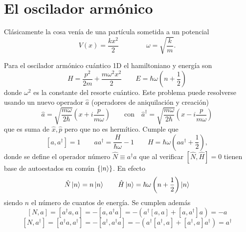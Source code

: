 \documentclass[10pt,oneside]{CBFT_book}
\begin{document}
% 
\chapter{El oscilador armónico}

Clásicamente la cosa venía de una partícula sometida a un potencial
\[
	V(x) = \frac{kx^2}{2} \qquad \qquad \omega = \sqrt{\frac{k}{m}}.
\]

Para el oscilador armónico cuántico 1D el hamiltoniano y energía son
\[
	H = \frac{p^2}{2m} + \frac{m\omega^2 x^2}{2} \qquad E = \hbar \omega \left( n + \frac{1}{2} \right)
\]
donde $\omega^2$ es la constante del resorte cuántico.
Este problema puede resolverse usando un nuevo operador $\hat{a}$ (operadores de aniquilación
y creación)
\[
	\hat{a} = \sqrt{\frac{m\omega}{2\hbar}}\left( x + i\frac{p}{m\omega} \right) \qquad \text{con} \quad 
	\hat{a}^\dagger = \sqrt{\frac{m\omega}{2\hbar}}\left( x - i\frac{p}{m\omega} \right)
\]
que es suma de $\hat{x}, \hat{p}$ pero que no es hermítico. Cumple que 
\[
	[a , a^\dagger ] = 1 \qquad a a^\dagger =  \frac{H}{\hbar\omega} -1 \qquad 
	H = \hbar\omega \left( a a^\dagger + \frac{1}{2} \right),
\]
donde se define el operador número $\hat{N}\equiv a^\dagger a$ que al verificar $[\hat{N},\hat{H}]=0$ tienen 
base de 
autoestados en común $\{ \Ket{n} \}$. En efecto 
\[
	\hat{N} \Ket{n} = n\Ket{n} \qquad
	\hat{H} \Ket{n} = \hbar\omega \left( n + \frac{1}{2} \right) \Ket{n}
\]
siendo $n$ el número de cuantos de energía.
Se cumplen además 
\[
	[N,a] = [a^\dagger a,a] = - [ a, a^\dagger a ] = - \left( a^\dagger [a,a] + [a,a^\dagger]a \right) =
	-a
\]
\[
	[N,a^\dagger] = [a^\dagger a, a^\dagger ] = - [a^\dagger , a^\dagger a ] =
	- \left( a^\dagger [a^\dagger,a] + [a^\dagger,a]a^\dagger \right) = a^\dagger
\]
\end{document}
